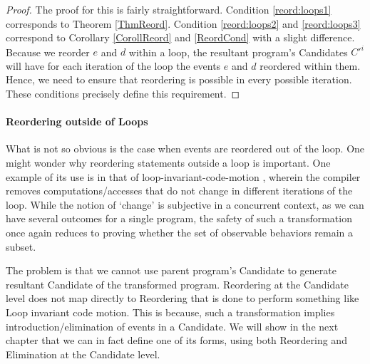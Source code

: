         \begin{proof}
        
            The proof for this is fairly straightforward. 
            Condition \ref{reord:loops1} corresponds to Theorem \ref{ThmReord}. 
            Condition \ref{reord:loops2} and \ref{reord:loops3} correspond to Corollary \ref{CorollReord} and \ref{ReordCond} with a slight difference. 
            Because we reorder $e$ and $d$ within a loop, the resultant program's Candidates $C'^i$ will have for each iteration of the loop the events $e$ and $d$ reordered within them. 
            Hence, we need to ensure that reordering is possible in every possible iteration. 
            These conditions precisely define this requirement\footnotemark. 
            

        \end{proof}

        \paragraph{Reordering outside of Loops}

            What is not so obvious is the case when events are reordered out of the loop. 
            One might wonder why reordering statements outside a loop is important. 
            One example of its use is in that of loop-invariant-code-motion \cite{Muchnick}, wherein the compiler removes computations/accesses that do not change in different iterations of the loop. 
            While the notion of `change' is subjective in a concurrent context, as we can have several outcomes for a single program, the safety of such a transformation once again reduces to proving whether the set of observable behaviors remain a subset. 
             
            The problem is that we cannot use parent program's Candidate to generate resultant Candidate of the transformed program. 
            Reordering at the Candidate level does not map directly to Reordering that is done to perform something like Loop invariant code motion. 
            This is because, such a transformation implies introduction/elimination of events in a Candidate.
            We will show in the next chapter that we can in fact define one of its forms, using both Reordering and Elimination at the Candidate level.

           
    